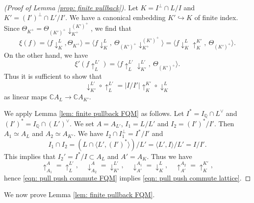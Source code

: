 \documentclass[12pt]{amsart}
\numberwithin{equation}{section}
\theoremstyle{definition}
\theoremstyle{remark}
\newcommand{\Q}{\mathbb{Q}}
\newcommand{\C}{\mathbb{C}}
\newcommand{\pullL}{\uparrow_{L}^{L'}}
\newcommand{\pushLK}{\downarrow^{L}_{K}}
\newcommand{\ThetaK}{\Theta_{K^{+}}}
\begin{document}
\begin{proof}[(Proof of Lemma \ref{prop: finite pullback})]
Let $K=I^{\perp}\cap L /I$ and $K'=(I')^{\perp}\cap L' /I'$. 
We have a canonical embedding $K'\hookrightarrow K$ of finite index. 
Since ${\ThetaK}=\Theta_{(K')^{+}}\!\downarrow^{(K')^{+}}_{K^{+}}$, 
we find that  
\begin{equation*}
\xi(f) 
= \langle f{\pushLK}, {\ThetaK} \rangle 
= \langle f{\pushLK}, \: \Theta_{(K')^{+}}\!\downarrow^{(K')^{+}}_{K^{+}} \rangle 
= \langle f{\pushLK}\uparrow_{K}^{K'}, \: \Theta_{(K')^{+}} \rangle. 
\end{equation*}
On the other hand, we have 
\begin{equation*}
\xi'(f \! \uparrow^{L'}_{L}) = 
\langle f {\pullL}\downarrow^{L'}_{K'}, \: \Theta_{(K')^{+}} \rangle. 
\end{equation*}
Thus it is sufficient to show that 
\begin{equation}\label{eqn: pull push commute lattice}
\downarrow^{L'}_{K'} \circ {\pullL} = |I/I'| \uparrow^{K'}_{K} \circ {\pushLK} 
\end{equation}
as linear maps 
${\C}A_{L}\to {\C}A_{K'}$. 

We apply Lemma \ref{lem: finite pullback FQM} as follows. 
Let $I^{\ast}=I_{{\Q}}\cap L^{\vee}$ and 
$(I')^{\ast} = I_{{\Q}}\cap (L')^{\vee}$. 
We set 
$A=A_{L'}$, 
$I_{1}=L/L'$ and 
$I_{2}=(I')^{\ast}/I'$. 
Then 
$A_{1}\simeq A_{L}$ and  
$A_{2}\simeq A_{K'}$. 
We have 
$I_{2}\cap I_{1}^{\perp}=I^{\ast}/I'$ and 
\begin{equation*}
I_{1} \cap I_{2} 
= ( L\cap \langle L', (I')^{\ast} \rangle )/L' 
= \langle L', I \rangle /L' 
= I/I'. 
\end{equation*}
This implies that 
$I_{2}'=I^{\ast}/I \subset A_{L}$ 
and $A'= A_{K}$. 
Thus we have 
\begin{equation*}
\uparrow^{A}_{A_{1}} = \uparrow^{L'}_{L}, \quad 
\downarrow^{A}_{A_{2}} = \downarrow^{L'}_{K'}, \quad 
\downarrow^{A_{1}}_{A'} = \downarrow^{L}_{K}, \quad 
\uparrow^{A_{2}}_{A'} = \uparrow^{K'}_{K},  
\end{equation*}
hence \eqref{eqn: pull push commute FQM} implies \eqref{eqn: pull push commute lattice}.  
\end{proof}


We now prove Lemma \ref{lem: finite pullback FQM}. 
\end{document}
